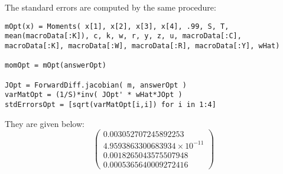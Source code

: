 \documentclass[12pt]{paper}
\begin{document}
The standard errors are computed by the same procedure:

\begin{verbatim}
mOpt(x) = Moments( x[1], x[2], x[3], x[4], .99, S, T,  mean(macroData[:K]), c, k, w, r, y, z, u, macroData[:C], macroData[:K], macroData[:W], macroData[:R], macroData[:Y], wHat)

momOpt = mOpt(answerOpt)

JOpt = ForwardDiff.jacobian( m, answerOpt )
varMatOpt = (1/S)*inv( JOpt' * wHat*JOpt )
stdErrorsOpt = [sqrt(varMatOpt[i,i]) for i in 1:4]
\end{verbatim}

They are given below:
\begin{equation*}
  \begin{pmatrix}
0.003052707245892253\\
 4.9593863300683934 \times 10^{-11}\\
 0.0018265043575507948\\
 0.0005365640009272416     
  \end{pmatrix}
\end{equation*}
\end{document}

